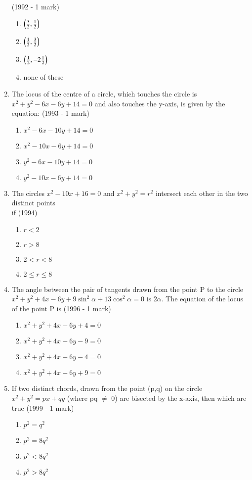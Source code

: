 \documentclass[journal,12pt,twocolumn]{IEEEtran}
\theoremstyle{remark}
\begin{document}
\begin{enumerate}
    \hfill {(1992 - 1 mark)}
    \begin{enumerate}[label=(\alph*)]
    \item $\left(\frac{3}{2},\frac{1}{2}\right)$
    \item $\left(\frac{1}{2},\frac{3}{2}\right)$
    \item $\left(\frac{1}{2},-2\frac{1}{2}\right)$
    \item none of these
    \end{enumerate}
    \item The locus of the centre of a circle, which touches the circle is $x^{2}+y^{2}-6x-6y+14=0$ and also touches the y-axis, is given by the equation: \hfill {(1993 - 1 mark)}
    \begin{enumerate}[label=(\alph*)]
    \item $x^{2}-6x-10y+14=0$
    \item $x^{2}-10x-6y+14=0$
    \item $y^{2}-6x-10y+14=0$
    \item $y^{2}-10x-6y+14=0$
    \end{enumerate}
    \item The circles $x^{2}-10x+16=0$ and $x^{2}+y^{2}=r^{2}$ intersect each other in the two distinct points\\ if
    \hfill {(1994)}
    \begin{enumerate}[label=(\alph*)]
    \item $r<2$
    \item $r>8$
    \item $2<r<8$
    \item $2\leq r\leq8$
    \end{enumerate}
    \item The angle between the pair of tangents drawn from the point P to the circle $x^{2}+y^{2}+4x-6y+9\sin^{2}{\alpha}+13\cos^{2}{\alpha}=0$ is 2$\alpha$. The equation of the locus of the point P is
    \hfill {(1996 - 1 mark)}
    \begin{enumerate}[label=(\alph*)]
    \item $x^{2}+y^{2}+4x-6y+4=0$
    \item $x^{2}+y^{2}+4x-6y-9=0$
    \item $x^{2}+y^{2}+4x-6y-4=0$
    \item $x^{2}+y^{2}+4x-6y+9=0$
    \end{enumerate}
    \item If two distinct chords, drawn from the point (p,q) on the circle $x^{2}+y^{2}=px+qy$ (where pq $\neq$ 0) are bisected by the x-axis, then which are true
    \hfill {(1999 - 1 mark)}
    \begin{enumerate}[label=(\alph*)]
    \item $p^{2}=q^{2}$
    \item $p^{2}=8q^{2}$ 
    \item $p^{2}<8q^{2}$
    \item $p^{2}>8q^{2}$
    \end{enumerate}
    
\end{enumerate}
\end{document}
